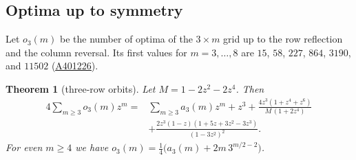 \documentclass[12pt]{article}
\theoremstyle{plain}
\newtheorem{theorem}{Theorem}
\theoremstyle{definition}
\theoremstyle{remark}
\newcommand{\seqnum}[1]{\href{https://oeis.org/#1}{\rm \underline{#1}}}
\begin{document}
\subsection{Optima up to symmetry}

Let $o_3(m)$ be the number of optima of the $3\times m$ grid up to the row
reflection and the column reversal. Its first values for $m=3,\dots,8$ are
$15$, $58$, $227$, $864$, $3190$, and $11502$ (\seqnum{A401226}).

\begin{theorem}[three-row orbits]\label{thm:threeorbits}
Let $M=1-2z^2-2z^4$. Then
\begin{align*}
4\sum_{m\ge3}o_3(m)z^m={}&\sum_{m\ge3}a_3(m)z^m+z^3+\frac{4z^3(1+z^4+z^6)}{M\,(1+2z^4)}\\
&+\frac{2z^3(1-z)(1+5z+3z^2-3z^3)}{(1-3z^2)^2}.
\end{align*}
For even $m\ge4$ we have $o_3(m)=\frac14\bigl(a_3(m)+2m\,3^{m/2-2}\bigr)$.
\end{theorem}
\end{document}
